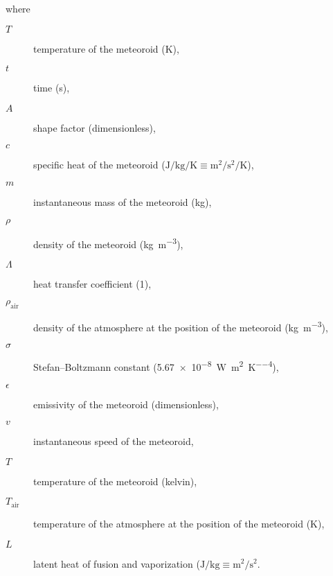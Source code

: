         where
        \begin{description}
            \item[$T$]
                temperature of the meteoroid ($\mathrm{K}$),
            \item[$t$]
                time (\si{\second}),
            \item[$A$]
                shape factor (dimensionless),
            \item[$c$]
                specific heat of the meteoroid ($\si{\joule\per\kilo\gram\per\kelvin} \equiv \si{\metre\squared\per\second\squared\per\kelvin}$),
            \item[$m$]
                instantaneous mass of the meteoroid (\si{\kilo\gram}),
            \item[$\rho$]
                density of the meteoroid (\si{\kilo\gram\per\metre\cubed}),
            \item[$\Lambda$]
                heat transfer coefficient (\si{1}),
            \item[$\rho_\mathrm{air}$]
                density of the atmosphere at the position of the meteoroid (\si{\kilo\gram\per\metre\cubed}),
            \item[$\sigma$]
                Stefan--Boltzmann constant (\SI{5.67e-8}{\watt\per\metre\squared\per\kelvin\tothe{4}}),
            \item[$\epsilon$]
                emissivity of the meteoroid (dimensionless),
            \item[$v$]
                instantaneous speed of the meteoroid,
            \item[$T$]
                temperature of the meteoroid (\si{kelvin}),
            \item[$T_\mathrm{air}$]
                temperature of the atmosphere at the position of the meteoroid (\si{\kelvin}),
            \item[$L$]
                latent heat of fusion and vaporization ($\si{\joule\per\kilo\gram} \equiv \si{\metre\squared\per\second\squared}$.

        \end{description}

